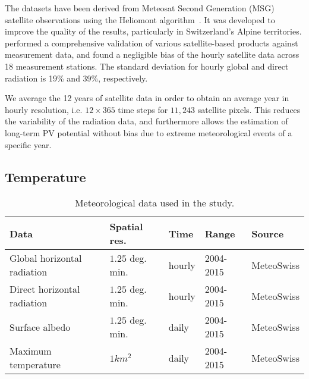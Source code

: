 The datasets have been derived from Meteosat Second Generation (MSG) satellite observations using the Heliomont algorithm~\cite{stockli_heliomont_2017}. It was developed to improve the quality of the results, particularly in Switzerland's Alpine territories. 
\citet{ineichen_long_2014} performed a comprehensive validation of various satellite-based products against measurement data, and found a negligible bias of the hourly satellite data across 18 measurement stations. 
The standard deviation for hourly global and direct radiation is 19\% and 39\%, respectively.

We average the 12 years of satellite data in order to obtain an average year in hourly resolution, i.e. $12 \times 365$ time steps for $11,243$ satellite pixels. This reduces the variability of the radiation data, and furthermore allows the estimation of long-term PV potential without bias due to extreme meteorological events of a specific year.

\subsection{Temperature}

\begin{table}[tb]
\centering
\footnotesize
\begin{tabular}{lllll} %
\hline
\textbf{Data}               & \textbf{Spatial res.}        & \textbf{Time} & \textbf{Range} & \textbf{Source} \\
\hline 
Global horizontal radiation & $1.25$ deg. min.\footnotemark & hourly              & 2004-2015          &  MeteoSwiss \cite{stockli_daily_2013} \\
Direct horizontal radiation & $1.25$ deg. min.\footnotemark[\value{footnote}] & hourly              & 2004-2015          &  MeteoSwiss \cite{stockli_daily_2013} \\
Surface albedo              & $1.25$ deg. min.\footnotemark[\value{footnote}] & daily               & 2004-2015          &  MeteoSwiss \cite{stockli_daily_2013} \\
Maximum temperature         & $1 km^2$            & daily               & 2004-2015          &  MeteoSwiss \cite{meteoswiss_daily_2017} \\              
\hline
\end{tabular}
\caption{Meteorological data used in the study.}
\label{tab:meteo}
\end{table}

